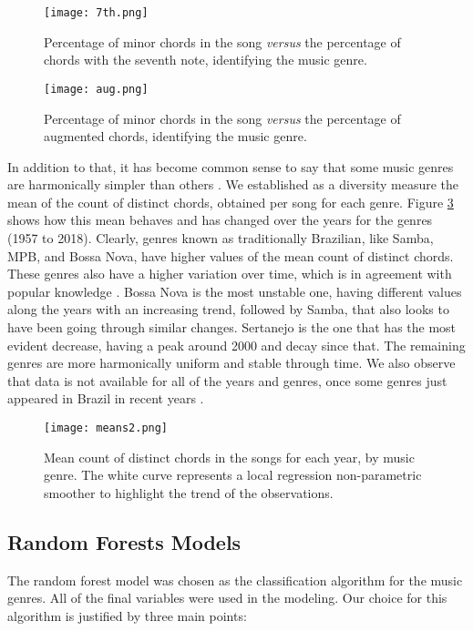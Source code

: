 \documentclass[twocolumn]{article}
\begin{document}
\begin{figure}[t]
\centering
\texttt{[image: 7th.png]}
\caption{Percentage of minor chords 
in the song \textit{versus} the percentage
of chords with the seventh note, 
identifying the music genre.}
\label{fig:7th}
\end{figure}

\begin{figure}[t]
\centering
\texttt{[image: aug.png]}
\caption{Percentage of minor chords 
in the song \textit{versus} the percentage
of augmented chords, identifying the music
genre.}
\label{fig:aug}
\end{figure}


In addition to that, it has become common sense to say 
that some music genres are harmonically simpler 
than others \cite{Almada2012}. We established as
a diversity measure the mean of the count of distinct 
chords, obtained per song for each genre. 
Figure \ref{fig:explor} shows how this mean behaves and
has changed over the years for the genres (1957 to 2018). Clearly, 
genres known as traditionally Brazilian, 
like Samba, MPB, and Bossa Nova, have higher values 
of the mean count of distinct chords. These genres 
also have a higher variation over time, 
which is in agreement with popular knowledge
\cite{Caldas2010}. Bossa Nova is the most
unstable one, having different values along the years
with an increasing trend, followed by Samba, that also
looks to have been going through similar changes. 
Sertanejo is the one that has the most evident
decrease, having a peak around 2000 and decay since that. The remaining genres are more harmonically uniform
and stable through time. We also observe
that data is not available for all of the years and genres, once some genres just appeared in Brazil in 
recent years \cite{Caldas2010}. 

\begin{figure}[h]
\centering
\texttt{[image: means2.png]}
\caption{Mean count of distinct chords in the songs for each year, by music genre. The white curve represents a local regression non-parametric smoother to highlight the trend of the observations.}
\label{fig:explor}
\end{figure}

\subsection{Random Forests Models}

The random forest model was chosen as the 
classification algorithm for the music genres. All 
of the final variables were used in the modeling. 
Our choice for this algorithm is justified by three main points:
\end{document}
